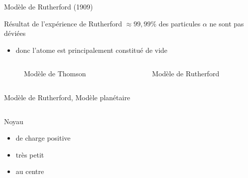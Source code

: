 \documentclass[handout,8pt]{beamer} %
\begin{document}
\begin{frame}{Modèle de Rutherford (1909)}

	\begin{block}{Résultat de l'expérience de Rutherford}
		$\approx 99,99\%$ des particules $\alpha$ ne sont pas déviées
		\begin{itemize}
			\item donc l'atome est principalement constitué de vide
		\end{itemize}
	\end{block}

	\begin{columns}
		\begin{column}{0.45\textwidth}
			\begin{figure}
			\caption{Modèle de Thomson}
			\end{figure}
		\end{column}
		\begin{column}{0.45\textwidth}
			\begin{figure}
			\caption{Modèle de Rutherford}
			\end{figure}
		\end{column}
	\end{columns}
	
	\begin{block}{Modèle de Rutherford, Modèle planétaire}
		\begin{description}
			\begin{columns}
					\begin{column}{0.35\textwidth}
					\item[Noyau]
			\begin{itemize}
				\item de charge positive
				\item très petit
				\item au centre
			\end{itemize}
			

\end{column}
\end{columns}
\end{description}
\end{block}
\end{frame}
\end{document}
